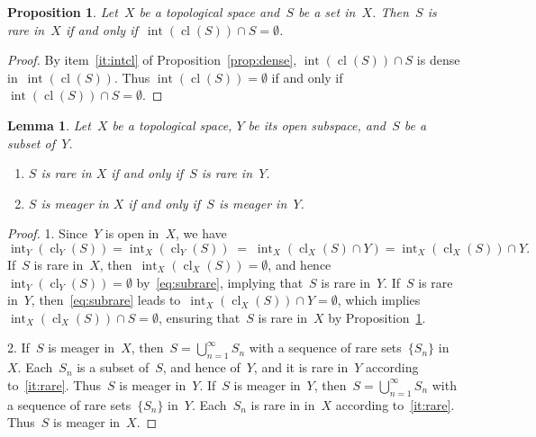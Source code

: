 \documentclass[11pt,a4paper]{article}  %
\newtheorem{lemma}{Lemma}[section]
\newtheorem{proposition}{Proposition}[section]
\theoremstyle{definition}
\DeclareMathOperator{\inter}{int}
\DeclareMathOperator{\cl}{cl}
\numberwithin{equation}{section}
\begin{document}
\begin{proposition}
  \label{prop:intclr}
  Let~$X$ be a topological space and~$S$ be a set in~$X$. Then~$S$ is rare in~$X$ if and only
  if~$\inter(\cl(S)) \cap S = \emptyset$.
\end{proposition}

\begin{proof}
  By item~\ref{it:intcl} of Proposition~\ref{prop:dense}, $\inter(\cl(S)) \cap S$ is dense
  in~$\inter(\cl(S))$. Thus $\inter(\cl(S)) = \emptyset$ if and only if $\inter(\cl(S)) \cap S = \emptyset$.
\end{proof}

\begin{lemma}
  \label{lem:openb}
  Let~$X$ be a topological space, $Y$ be its open subspace, and~$S$ be a subset of~$Y$.
  \begin{enumerate}
    \item \label{it:rare}$S$ is rare in $X$ if and only if~$S$ is rare in~$Y$.
    \item $S$ is meager in $X$ if and only if~$S$ is meager in~$Y$.
  \end{enumerate}
\end{lemma}

\begin{proof}
  1. Since~$Y$ is open in~$X$, we have
 \begin{equation}
   \label{eq:subrare}
     \inter_Y(\cl_Y(S)) = \inter_X(\cl_Y(S)) \;=\; \inter_X(\cl_X(S)\cap Y) = \inter_X(\cl_X(S))\cap Y.
 \end{equation}
   If~$S$ is rare in~$X$, then~$\inter_X(\cl_X(S))=\emptyset$, and hence~$\inter_Y(\cl_Y(S))
   = \emptyset$ by~\eqref{eq:subrare},
   implying that~$S$ is rare in~$Y$.
   If~$S$ is rare in~$Y$, then~\eqref{eq:subrare} leads
   to~$\inter_{X}(\cl_X(S))\cap Y = \emptyset$, which implies~$\inter_X(\cl_X(S))\cap
   S = \emptyset$,  ensuring that~$S$ is rare in~$X$ by Proposition~\ref{prop:intclr}.

   2. If~$S$ is meager in~$X$, then~$S= \bigcup_{n=1}^\infty S_n$ with a sequence of rare
   sets~$\{S_n\}$ in~$X$. Each~$S_n$ is a subset of~$S$, and hence of~$Y$, and it is rare
   in~$Y$ according to~\ref{it:rare}. Thus~$S$ is meager in~$Y$. If~$S$ is meager in~$Y$, then~$S
   = \bigcup_{n=1}^\infty S_n$ with a sequence of rare sets~$\{S_n\}$ in~$Y$. Each~$S_n$ is rare in
   in~$X$ according to~\ref{it:rare}. Thus~$S$ is meager in~$X$.
\end{proof}
\end{document}
